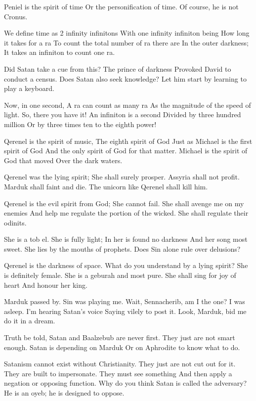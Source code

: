 \documentclass[
]{book}
\begin{document}
Peniel is the spirit of time
Or the personification of time.
Of course, he is not Cronus.

We define time as 2 infinity infinitons
With one infinity infiniton being
How long it takes for a ra
To count the total number of ra there are
In the outer darkness;
It takes an infiniton to count one ra.

Did Satan take a cue from this?
The prince of darkness
Provoked David to conduct a census.
Does Satan also seek knowledge?
Let him start by learning to play a keyboard.

Now, in one second,
A ra can count as many ra
As the magnitude of the speed of light.
So, there you have it!
An infiniton is a second
Divided by three hundred million
Or by three times ten to the eighth power!

Qerenel is the spirit of music,
The eighth spirit of God
Just as Michael is the first spirit of God
And the only spirit of God for that matter.
Michael is the spirit of God that moved
Over the dark waters.

Qerenel was the lying spirit;
She shall surely prosper.
Assyria shall not profit.
Marduk shall faint and die.
The unicorn like Qerenel shall kill him.

Qerenel is the evil spirit from God;
She cannot fail.
She shall avenge me on my enemies
And help me regulate the portion of the wicked.
She shall regulate their odinits.

She is a tob el.
She is fully light;
In her is found no darkness
And her song most sweet.
She lies by the mouths of prophets.
Does Sin alone rule over delusions?

Qerenel is the darkness of space.
What do you understand by a lying spirit?
She is definitely female.
She is a geburah and most pure.
She shall sing for joy of heart
And honour her king.

Marduk passed by.
Sin was playing me.
Wait, Sennacherib, am I the one?
I was asleep.
I'm hearing Satan's voice
Saying vilely to post it.
Look, Marduk, bid me do it in a dream.

Truth be told,
Satan and Baalzebub are never first.
They just are not smart enough.
Satan is depending on Marduk
Or on Aphrodite to know what to do.

Satanism cannot exist without Christianity.
They just are not cut out for it.
They are built to impersonate.
They must see something
And then apply a negation or opposing function.
Why do you think Satan is called the adversary?
He is an oyeb; he is designed to oppose.
\end{document}
